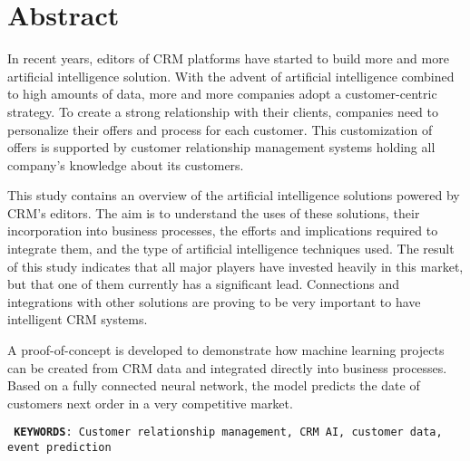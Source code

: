 

\chapter*{Abstract}

\vspace{0.5cm}

In recent years, editors of CRM platforms have started to build more and more artificial intelligence solution. With the advent of artificial intelligence combined to high amounts of data, more and more companies adopt a customer-centric strategy. To create a strong relationship with their clients, companies need to personalize their offers and process for each customer. This customization of offers is supported by customer relationship management systems holding all company's knowledge about its customers.

This study contains an overview of the artificial intelligence solutions powered by CRM's editors. The aim is to understand the uses of these solutions, their incorporation into business processes, the efforts and implications required to integrate them, and the type of artificial intelligence techniques used. The result of this study indicates that all major players have invested heavily in this market, but that one of them currently has a significant lead. Connections and integrations with other solutions are proving to be very important to have intelligent CRM systems.

A proof-of-concept is developed to demonstrate how machine learning projects can be created from CRM data and integrated directly into business processes. Based on a fully connected neural network, the model predicts the date of customers next order in a very competitive market.

\vspace{0.7cm}

\texttt{ \justifyi \textbf{KEYWORDS}: Customer relationship management, CRM AI, customer data, event prediction}

